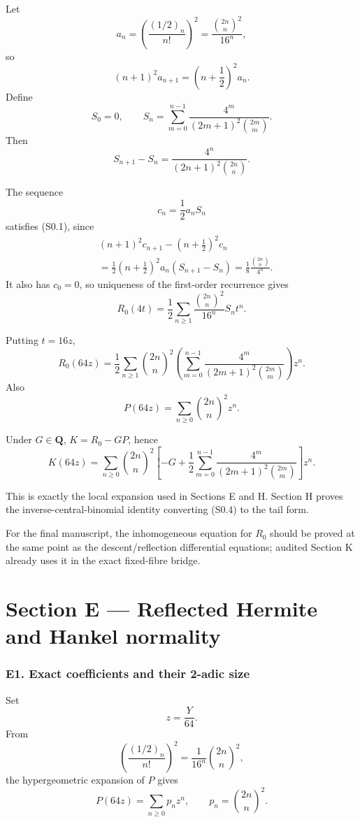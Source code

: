 \documentclass[
  10pt,
  letterpaper,
]{article}
\theoremstyle{definition}
\theoremstyle{remark}
\begin{document}
Let \[
a_n=\left(\frac{(1/2)_n}{n!}\right)^2
=\frac{\binom{2n}{n}^2}{16^n},
\] so \[
(n+1)^2a_{n+1}=\left(n+\frac12\right)^2a_n.
\] Define \[
S_0=0,\qquad
S_n=\sum_{m=0}^{n-1}
\frac{4^m}{(2m+1)^2\binom{2m}{m}}.
\] Then \[
S_{n+1}-S_n
=
\frac{4^n}{(2n+1)^2\binom{2n}{n}}.
\]

The sequence \[
c_n=\frac12a_nS_n
\] satisfies (S0.1), since \[
\begin{aligned}
&(n+1)^2c_{n+1}-\left(n+\frac12\right)^2c_n\\
&=
\frac12\left(n+\frac12\right)^2a_n(S_{n+1}-S_n)
=
\frac18\frac{\binom{2n}{n}}{4^n}.
\end{aligned}
\] It also has \(c_0=0\), so uniqueness of the first-order recurrence
gives \[
R_0(4t)=
\frac12\sum_{n\ge1}
\frac{\binom{2n}{n}^2}{16^n}S_nt^n.
\]

Putting \(t=16z\), \[
\boxed{
R_0(64z)=
\frac12\sum_{n\ge1}\binom{2n}{n}^2
\left(
\sum_{m=0}^{n-1}
\frac{4^m}{(2m+1)^2\binom{2m}{m}}
\right)z^n.
}
\tag{S0.2}
\] Also \[
\boxed{
P(64z)=\sum_{n\ge0}\binom{2n}{n}^2z^n.
}
\tag{S0.3}
\]

Under \(G\in\mathbf Q\), \(K=R_0-GP\), hence \[
\boxed{
K(64z)=
\sum_{n\ge0}\binom{2n}{n}^2
\left[
-G+
\frac12\sum_{m=0}^{n-1}
\frac{4^m}{(2m+1)^2\binom{2m}{m}}
\right]z^n.
}
\tag{S0.4}
\]

This is exactly the local expansion used in Sections E and H. Section H
proves the inverse-central-binomial identity converting (S0.4) to the
tail form.

For the final manuscript, the inhomogeneous equation for \(R_0\) should
be proved at the same point as the descent/reflection differential
equations; audited Section K already uses it in the exact fixed-fibre
bridge.

\section{Section E --- Reflected Hermite and Hankel
normality}\label{section-e-reflected-hermite-and-hankel-normality}

\subsubsection{E1. Exact coefficients and their 2-adic
size}\label{e1.-exact-coefficients-and-their-2-adic-size}

Set \[
z=\frac Y{64}.
\] From \[
\left(\frac{(1/2)_n}{n!}\right)^2
=\frac1{16^n}\binom{2n}{n}^2,
\] the hypergeometric expansion of \(P\) gives \[
P(64z)=\sum_{n\ge0}p_nz^n,
\qquad
p_n=\binom{2n}{n}^2.
\]
\end{document}
